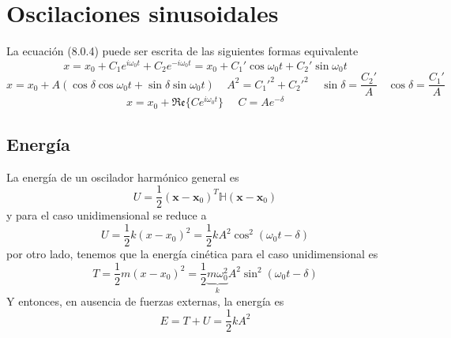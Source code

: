 \section{Oscilaciones sinusoidales}
La ecuación (8.0.4) puede ser escrita de las siguientes formas equivalente
\begin{equation} \label{6.1.1}
    x = x_0 + C_1e^{i\omega_0t}+ C_2e^{-i\omega_0t} = x_0 + C_1'\cos\omega_0 t + C_2'\sin \omega_0 t
\end{equation}
\vspace{-25pt}
\begin{equation} \label{6.1.1}
    x = x_0 + A\left(\cos\delta\cos\omega_0 t + \sin\delta\sin \omega_0 t\right) \ \ \ \ \ A^2 = C_1'^2+C_2'^2 \ \ \ \ \ \sin\delta = \frac{C_2'}{A} \ \ \ \ \cos\delta = \frac{C_1'}{A}
\end{equation}
\vspace{-15pt}
\begin{equation} \label{6.1.1}
    x =  x_0 + \mathfrak{Re}\{C e^{i\omega_0t}\} \ \ \ \ \ \ C = A e^{-\delta}
\end{equation}
\subsection{Energía}
La energía de un oscilador harmónico general es 
\begin{equation} \label{6.1.1}
    U = \frac{1}{2}(\mathbf{x}-\mathbf{x}_0)^T \mathbb{H} (\mathbf{x}-\mathbf{x}_0)
\end{equation}
y para el caso unidimensional se reduce a 
\begin{equation} \label{6.1.1}
    U = \frac{1}{2}k(x-x_0)^2 = \frac{1}{2}kA^2 \cos^2(\omega_0t-\delta)
\end{equation}
por otro lado, tenemos que la energía cinética para el caso unidimensional es 
\begin{equation} \label{6.1.1}
    T = \frac{1}{2}m(x-x_0)^2 = \frac{1}{2}\underbrace{m\omega_0^2}_k A^2 \sin^2(\omega_0t-\delta)
\end{equation}
Y entonces, en ausencia de fuerzas externas, la energía es
\begin{equation} \label{6.1.1}
    E = T+U = \frac{1}{2} k A^2
\end{equation}
\vspace{-25pt}
